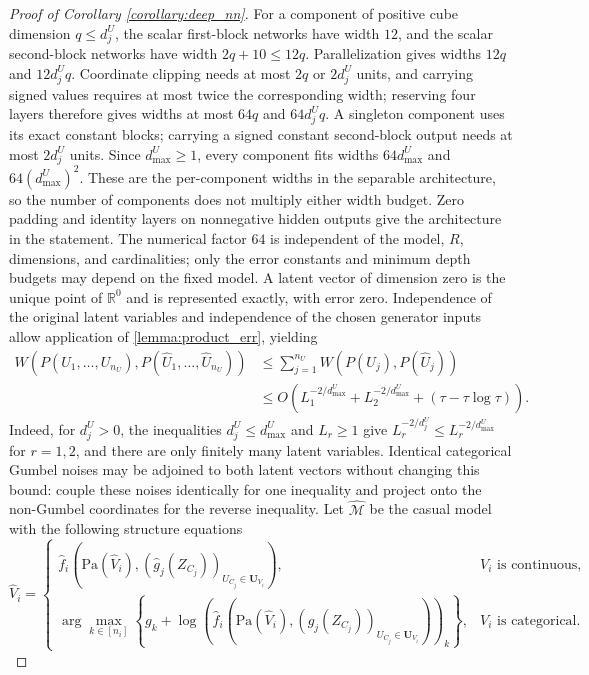 \begin{proof}[Proof of Corollary \ref{corollary:deep_nn}]
For a component of positive cube dimension $q\leqslant d_j^U$, the scalar first-block networks have width $12$, and the scalar second-block networks have width $2q+10\leqslant12q$. Parallelization gives widths $12q$ and $12d_j^Uq$. Coordinate clipping needs at most $2q$ or $2d_j^U$ units, and carrying signed values requires at most twice the corresponding width; reserving four layers therefore gives widths at most $64q$ and $64d_j^Uq$. A singleton component uses its exact constant blocks; carrying a signed constant second-block output needs at most $2d_j^U$ units. Since $d_{\max}^U\geqslant1$, every component fits widths $64d_{\max}^U$ and $64(d_{\max}^U)^2$. These are the per-component widths in the separable architecture, so the number of components does not multiply either width budget. Zero padding and identity layers on nonnegative hidden outputs give the architecture in the statement. The numerical factor $64$ is independent of the model, $R$, dimensions, and cardinalities; only the error constants and minimum depth budgets may depend on the fixed model. A latent vector of dimension zero is the unique point of $\mathbb R^0$ and is represented exactly, with error zero. Independence of the original latent variables and independence of the chosen generator inputs allow application of \cref{lemma:product_err}, yielding
\begin{align*}
W(P(U_1,\ldots,U_{n_U}),P(\hat U_1,\ldots,\hat U_{n_U}))
&\leqslant\sum_{j=1}^{n_U}W(P(U_j),P(\hat U_j))\\
&\leqslant O\left(L_1^{-2/d_{\max}^U}+L_2^{-2/d_{\max}^U}+(\tau-\tau\log\tau)\right).
\end{align*}
Indeed, for $d_j^U>0$, the inequalities $d_j^U\leqslant d_{\max}^U$ and $L_r\geqslant1$ give $L_r^{-2/d_j^U}\leqslant L_r^{-2/d_{\max}^U}$ for $r=1,2$, and there are only finitely many latent variables. Identical categorical Gumbel noises may be adjoined to both latent vectors without changing this bound: couple these noises identically for one inequality and project onto the non-Gumbel coordinates for the reverse inequality.
      Let $ \hat{\mathcal{M}}$ be the casual model with the following structure equations
     \begin{equation*}
\hat{V}_{i} =\begin{cases}
\hat{f}_{i}\left(\text{Pa} (\hat{V}_{i} ),(\hat{g}_{j} (Z_{C_{j}} ))_{U_{C_{j} }\in \boldsymbol{U}_{V_{i}}}\right), & V_{i}  \text{ is continuous} ,\\
\arg\max_{k\in [ n_{i}]}\left\{g_{k} +\log\left(\hat{f}_{i}\left(\text{Pa} (\hat{V}_{i} ),(\hat{g}_{j} (Z_{C_{j}} ))_{U_{C_{j} } \in \boldsymbol{U}_{V_{i}}}\right)  \right)_{k}\right\} , & V_{i}  \text{ is categorical} .

\end{cases}
\end{equation*}
\end{proof}
